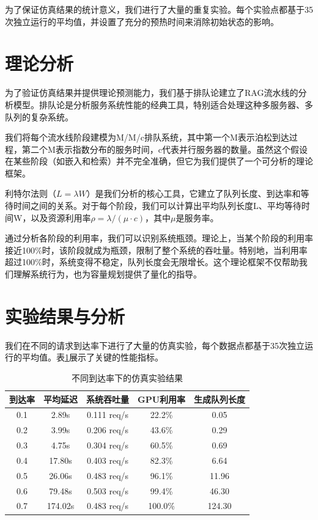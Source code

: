 \documentclass[a4paper]{article}
\begin{document}
为了保证仿真结果的统计意义，我们进行了大量的重复实验。每个实验点都基于35次独立运行的平均值，并设置了充分的预热时间来消除初始状态的影响。

\section{理论分析}

为了验证仿真结果并提供理论预测能力，我们基于排队论\cite{kleinrock1975queueing}建立了RAG流水线的分析模型。排队论是分析服务系统性能的经典工具，特别适合处理这种多服务器、多队列的复杂系统\cite{golub2014scientific}。

我们将每个流水线阶段建模为M/M/c排队系统，其中第一个M表示泊松到达过程，第二个M表示指数分布的服务时间，c代表并行服务器的数量。虽然这个假设在某些阶段（如嵌入和检索）并不完全准确，但它为我们提供了一个可分析的理论框架。

利特尔法则（$L = \lambda W$）是我们分析的核心工具，它建立了队列长度、到达率和等待时间之间的关系。对于每个阶段，我们可以计算出平均队列长度L、平均等待时间W，以及资源利用率$\rho = \lambda / (\mu \cdot c)$，其中$\mu$是服务率。

通过分析各阶段的利用率，我们可以识别系统瓶颈。理论上，当某个阶段的利用率接近100\%时，该阶段就成为瓶颈，限制了整个系统的吞吐量。特别地，当利用率超过100\%时，系统变得不稳定，队列长度会无限增长。这个理论框架不仅帮助我们理解系统行为，也为容量规划提供了量化的指导。

\section{实验结果与分析}

我们在不同的请求到达率下进行了大量的仿真实验，每个数据点都基于35次独立运行的平均值。表\ref{table:simulation}展示了关键的性能指标。

\begin{table}[H]
  \centering
  \begin{tabular}{|c|c|c|c|c|}
  \hline
  到达率 & 平均延迟 & 系统吞吐量 & GPU利用率 & 生成队列长度 \\
  \hline
  0.1 & 2.89s & 0.111 req/s & 22.2\% & 0.05 \\
  0.2 & 3.99s & 0.206 req/s & 43.6\% & 0.29 \\
  0.3 & 4.75s & 0.304 req/s & 60.5\% & 0.69 \\
  0.4 & 17.80s & 0.403 req/s & 82.3\% & 6.64 \\
  0.5 & 26.06s & 0.483 req/s & 96.1\% & 11.96 \\
  0.6 & 79.48s & 0.503 req/s & 99.4\% & 46.30 \\
  0.7 & 174.02s & 0.483 req/s & 100.0\% & 124.30 \\
  \hline
  \end{tabular}
  \caption{不同到达率下的仿真实验结果}
  \label{table:simulation}
\end{table}
\end{document}
